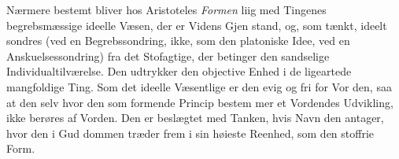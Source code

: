 \documentclass[12pt,a4paper]{book}
\begin{document}
Nærmere bestemt bliver hos Aristoteles \emph{Formen} liig med
Tingenes begrebsmæssige ideelle Væsen, der er Videns Gjen\-%
stand, og, som tænkt, ideelt sondres (ved en Begrebssondring,
ikke, som den platoniske Idee, ved en Anskuelsessondring) fra
det Stofagtige, der betinger den sandselige Individualtilværelse.
Den udtrykker den objective Enhed i de ligeartede mangfoldige
Ting. Som det ideelle Væsentlige er den evig og fri for Vor\-%
den, saa at den selv hvor den som formende Princip bestem\-%
mer et Vordendes Udvikling, ikke berøres af Vorden. Den er
beslægtet med Tanken, hvis Navn den antager, hvor den i Gud\-%
dommen træder frem i sin høieste Reenhed, som den stoffrie Form.
\end{document}
